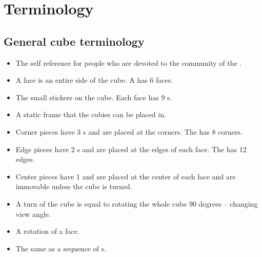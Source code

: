 \chapter{Terminology}
\section{General cube terminology}
\label{sec:generalNotation}
\begin{itemize}
\item {}The self reference for people who are devoted to the community of the \rubik{}. 
\item {}A face is an entire side of the cube. A \rubik{} has 6 faces.
\item {}The small stickers on the cube. Each face has 9 \facet{}s.
\item \myTermHigh{\cubicle{}} A static frame that the cubies can be placed in.
\item {}Corner pieces have 3 \facet{}s and are placed at the corners. The \rubik{} has 8 corners. 
\item {}Edge pieces have 2 \facet{}s and are placed at the edges of each face. The \rubik{} has 12 edges.
\item {}Center pieces have 1 \facet{} and are placed at the center of each face and are immovable unless the cube is turned. 
\item {}A turn of the cube is equal to rotating the whole cube 90 degrees -- changing view angle.
\item {}A rotation of a face.%
\item {}  The same as a sequence of \twist{}s.
\end{itemize}

